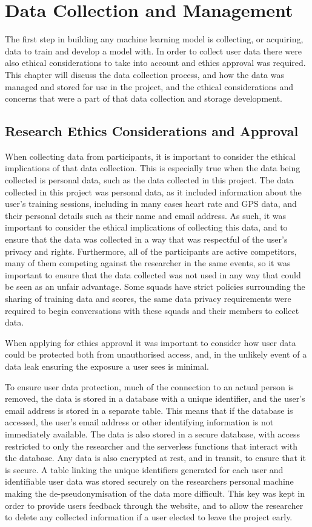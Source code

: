 \chapter{Data Collection and Management}
The first step in building any machine learning model is collecting, or acquiring, data to train and develop a model with. In order to collect user data there were also ethical considerations to take into account and ethics approval was required. This chapter will discuss the data collection process, and how the data was managed and stored for use in the project, and the ethical considerations and concerns that were a part of that data collection and storage development.

\section{Research Ethics Considerations and Approval}
When collecting data from participants, it is important to consider the ethical implications of that data collection. This is especially true when the data being collected is personal data, such as the data collected in this project. The data collected in this project was personal data, as it included information about the user's training sessions, including in many cases heart rate and GPS data, and their personal details such as their name and email address. As such, it was important to consider the ethical implications of collecting this data, and to ensure that the data was collected in a way that was respectful of the user's privacy and rights. Furthermore, all of the participants are active competitors, many of them competing against the researcher in the same events, so it was important to ensure that the data collected was not used in any way that could be seen as an unfair advantage. Some squads have strict policies surrounding the sharing of training data and scores, the same data privacy requirements were required to begin conversations with these squads and their members to collect data. 

When applying for ethics approval it was important to consider how user data could be protected both from unauthorised access, and, in the unlikely event of a data leak ensuring the exposure a user sees is minimal.

To ensure user data protection, much of the connection to an actual person is removed, the data is stored in a database with a unique identifier, and the user's email address is stored in a separate table. This means that if the database is accessed, the user's email address or other identifying information is not immediately available. The data is also stored in a secure database, with access restricted to only the researcher and the serverless functions that interact with the database. Any data is also encrypted at rest, and in transit, to ensure that it is secure. A table linking the unique identifiers generated for each user and identifiable user data was stored securely on the researchers personal machine making the de-pseudonymisation of the data more difficult. This key was kept in order to provide users feedback through the website, and to allow the researcher to delete any collected information if a user elected to leave the project early.

